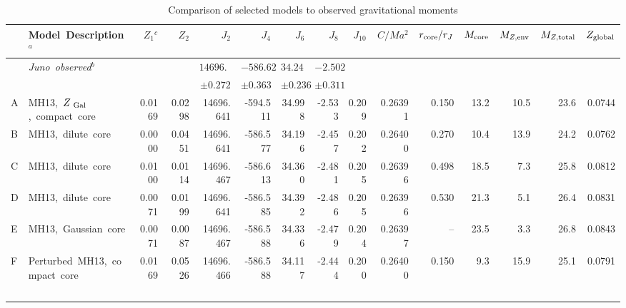 \begin{sidewaystable}
\caption{Comparison of selected models to observed gravitational moments}
\label{tab:models}

\begin{adjustbox}{max width=\textheight}
\begin{tabular}{llrrrrrrrrrrrrr}
    \hline
    
    & Model~Description$^{a}$ &    $Z_1$$^{c}$ &        $Z_2$ &            $J_2$ &          $J_4$ &         $J_6$        &        $J_8$ &        $J_{10}$ &     $C/Ma^2$ &  $r_{\rm core}/r_J$ &     $M_{\rm core}$ &        $M_{Z,{\rm env}}$ &  $M_{Z,{\rm total}}$ &  $Z_{\rm global}$ \\
\hline
& \it{Juno}~observed$^{b}$                        & & & $14696.514$   & $-586.623$   &  $34.244$   & $-2.502$ &   &  &         &  &         &  &       \\
 &                                         & & & $\pm 0.272$   & $\pm 0.363$   &  $\pm 0.236$  & $\pm 0.311$ &  &  &         &  &         &  &       \\
\hline
A & MH13,~$Z_{\rm~Gal}$,~compact~core                &  0.0169  &  0.0298  &  14696.641  &  -594.511  &  34.998  &  -2.533  &  0.209  &  0.26391  &  0.150  &  13.2  &  10.5  &  23.6  &  0.0744  \\
\rowcolor{blue!15}
B & MH13,~dilute~core                   &  0.0000  &  0.0451  &  14696.641  &  -586.577  &  34.196  &  -2.457  &  0.202  &  0.26400  &  0.270  &  10.4  &  13.9  &  24.2  &  0.0762  \\
\rowcolor{blue!15}
C & MH13,~dilute~core                  &  0.0100  &  0.0114  &  14696.467  &  -586.613  &  34.360  &  -2.481  &  0.205  &  0.26396  &  0.498  &  18.5  &  7.3   &  25.8  &  0.0812  \\
\rowcolor{blue!15}
D & MH13,~dilute~core                 &  0.0071  &  0.0199  &  14696.641  &  -586.585  &  34.392  &  -2.486  &  0.205  &  0.26396  &  0.530  &  21.3  &  5.1   &  26.4  &  0.0831  \\
\rowcolor{blue!15}
E & MH13,~Gaussian~core                &  0.0071  &  0.0087  &  14696.467  &  -586.588  &  34.336  &  -2.479  &  0.204  &  0.26397  &  --     &  23.5  &  3.3   &  26.8  &  0.0843  \\
\rowcolor{blue!15}
F & Perturbed~MH13,~compact~core  &  0.0169  &  0.0526  &  14696.466  &  -586.588  &  34.117  &  -2.444  &  0.200  &  0.26400  &  0.150  &  9.3   &  15.9  &  25.1  &  0.0791  \\
$$
\end{tabular}
\end{adjustbox}
\end{sidewaystable}
